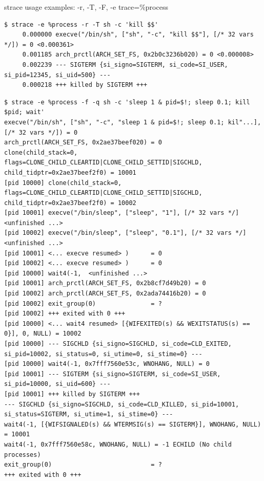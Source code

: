 \documentclass[unicode,aspectratio=169]{beamer}
\begin{document}
\begin{frame}[fragile]{strace usage examples: -r, -T, -F, -e trace=\%process}
\Tiny
\begin{verbatim}
$ strace -e %process -r -T sh -c 'kill $$'
     0.000000 execve("/bin/sh", ["sh", "-c", "kill $$"], [/* 32 vars */]) = 0 <0.000361>
     0.001185 arch_prctl(ARCH_SET_FS, 0x2b0c3236b020) = 0 <0.000008>
     0.002239 --- SIGTERM {si_signo=SIGTERM, si_code=SI_USER, si_pid=12345, si_uid=500} ---
     0.000218 +++ killed by SIGTERM +++
\end{verbatim}

\begin{verbatim}
$ strace -e %process -f -q sh -c 'sleep 1 & pid=$!; sleep 0.1; kill $pid; wait'
execve("/bin/sh", ["sh", "-c", "sleep 1 & pid=$!; sleep 0.1; kil"...], [/* 32 vars */]) = 0
arch_prctl(ARCH_SET_FS, 0x2ae37beef020) = 0
clone(child_stack=0, flags=CLONE_CHILD_CLEARTID|CLONE_CHILD_SETTID|SIGCHLD, child_tidptr=0x2ae37beef2f0) = 10001
[pid 10000] clone(child_stack=0, flags=CLONE_CHILD_CLEARTID|CLONE_CHILD_SETTID|SIGCHLD, child_tidptr=0x2ae37beef2f0) = 10002
[pid 10001] execve("/bin/sleep", ["sleep", "1"], [/* 32 vars */] <unfinished ...>
[pid 10002] execve("/bin/sleep", ["sleep", "0.1"], [/* 32 vars */] <unfinished ...>
[pid 10001] <... execve resumed> )      = 0
[pid 10002] <... execve resumed> )      = 0
[pid 10000] wait4(-1,  <unfinished ...>
[pid 10001] arch_prctl(ARCH_SET_FS, 0x2b8cf7d49b20) = 0
[pid 10002] arch_prctl(ARCH_SET_FS, 0x2ada74416b20) = 0
[pid 10002] exit_group(0)               = ?
[pid 10002] +++ exited with 0 +++
[pid 10000] <... wait4 resumed> [{WIFEXITED(s) && WEXITSTATUS(s) == 0}], 0, NULL) = 10002
[pid 10000] --- SIGCHLD {si_signo=SIGCHLD, si_code=CLD_EXITED, si_pid=10002, si_status=0, si_utime=0, si_stime=0} ---
[pid 10000] wait4(-1, 0x7fff7560e53c, WNOHANG, NULL) = 0
[pid 10001] --- SIGTERM {si_signo=SIGTERM, si_code=SI_USER, si_pid=10000, si_uid=600} ---
[pid 10001] +++ killed by SIGTERM +++
--- SIGCHLD {si_signo=SIGCHLD, si_code=CLD_KILLED, si_pid=10001, si_status=SIGTERM, si_utime=1, si_stime=0} ---
wait4(-1, [{WIFSIGNALED(s) && WTERMSIG(s) == SIGTERM}], WNOHANG, NULL) = 10001
wait4(-1, 0x7fff7560e58c, WNOHANG, NULL) = -1 ECHILD (No child processes)
exit_group(0)                           = ?
+++ exited with 0 +++
\end{verbatim}
\end{frame}
\end{document}
